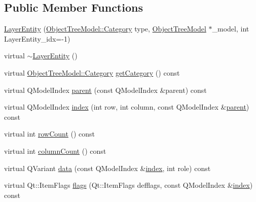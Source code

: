 \subsection*{Public Member Functions}
\begin{DoxyCompactItemize}
\item 
\mbox{\hyperlink{classobjecttree_1_1_layer_entity_a19639a7880438c625c70622cc7cc57d1}{Layer\+Entity}} (\mbox{\hyperlink{class_object_tree_model_a379e9d6b0d381853785adf62095ba4e3}{Object\+Tree\+Model\+::\+Category}} type, \mbox{\hyperlink{class_object_tree_model}{Object\+Tree\+Model}} $\ast$\+\_\+model, int Layer\+Entity\+\_\+idx=-\/1)
\item 
virtual \mbox{\hyperlink{classobjecttree_1_1_layer_entity_a233905520de9817b319a72ef2591f777}{$\sim$\+Layer\+Entity}} ()
\item 
virtual \mbox{\hyperlink{class_object_tree_model_a379e9d6b0d381853785adf62095ba4e3}{Object\+Tree\+Model\+::\+Category}} \mbox{\hyperlink{classobjecttree_1_1_layer_entity_a5f5e84032c7704a976dab26fb28b6f53}{get\+Category}} () const
\item 
virtual Q\+Model\+Index \mbox{\hyperlink{classobjecttree_1_1_layer_entity_a68d36c7d2efe34d58e47d412e7cdd5b7}{parent}} (const Q\+Model\+Index \&parent) const
\item 
virtual Q\+Model\+Index \mbox{\hyperlink{classobjecttree_1_1_layer_entity_a168d47ed5cdde5455a5b0f124cbee0a9}{index}} (int row, int column, const Q\+Model\+Index \&\mbox{\hyperlink{classobjecttree_1_1_layer_entity_a68d36c7d2efe34d58e47d412e7cdd5b7}{parent}}) const
\item 
virtual int \mbox{\hyperlink{classobjecttree_1_1_layer_entity_a259e8a98d51dcc7377317ffd1a30c63b}{row\+Count}} () const
\item 
virtual int \mbox{\hyperlink{classobjecttree_1_1_layer_entity_a275f79511cd158727848d0bd255eba2b}{column\+Count}} () const
\item 
virtual Q\+Variant \mbox{\hyperlink{classobjecttree_1_1_layer_entity_ae75ee051374a32aca57aa48f31365216}{data}} (const Q\+Model\+Index \&\mbox{\hyperlink{classobjecttree_1_1_layer_entity_a168d47ed5cdde5455a5b0f124cbee0a9}{index}}, int role) const
\item 
virtual Qt\+::\+Item\+Flags \mbox{\hyperlink{classobjecttree_1_1_layer_entity_afe44a5207b2838788a2ccb34ffe5f527}{flags}} (Qt\+::\+Item\+Flags defflags, const Q\+Model\+Index \&\mbox{\hyperlink{classobjecttree_1_1_layer_entity_a168d47ed5cdde5455a5b0f124cbee0a9}{index}}) const
\item 

\end{DoxyCompactItemize}
